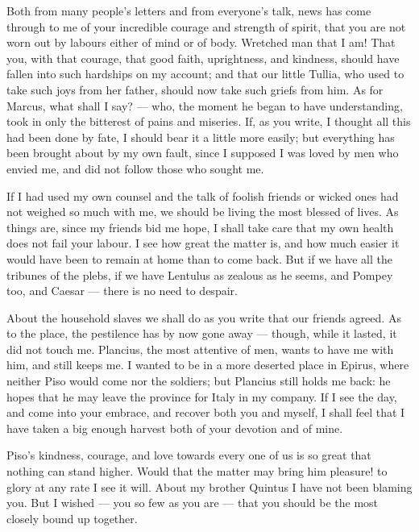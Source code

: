 

 Both from many people's letters and from everyone's talk, news has come through to me of your incredible courage and strength of spirit, that you are not worn out by labours either of mind or of body. Wretched man that I am! That you, with that courage, that good faith, uprightness, and kindness, should have fallen into such hardships on my account; and that our little Tullia, who used to take such joys from her father, should now take such griefs from him. As for Marcus, what shall I say? --- who, the moment he began to have understanding, took in only the bitterest of pains and miseries. If, as you write, I thought all this had been done by fate, I should bear it a little more easily; but everything has been brought about by my own fault, since I supposed I was loved by men who envied me, and did not follow those who sought me.

 If I had used my own counsel and the talk of foolish friends or wicked ones had not weighed so much with me, we should be living the most blessed of lives. As things are, since my friends bid me hope, I shall take care that my own health does not fail your labour. I see how great the matter is, and how much easier it would have been to remain at home than to come back. But if we have all the tribunes of the plebs, if we have Lentulus as zealous as he seems, and Pompey too, and Caesar --- there is no need to despair.

 About the household slaves we shall do as you write that our friends agreed. As to the place, the pestilence has by now gone away --- though, while it lasted, it did not touch me. Plancius, the most attentive of men, wants to have me with him, and still keeps me. I wanted to be in a more deserted place in Epirus, where neither Piso would come nor the soldiers; but Plancius still holds me back: he hopes that he may leave the province for Italy in my company. If I see the day, and come into your embrace, and recover both you and myself, I shall feel that I have taken a big enough harvest both of your devotion and of mine.

 Piso's kindness, courage, and love towards every one of us is so great that nothing can stand higher. Would that the matter may bring him pleasure! to glory at any rate I see it will. About my brother Quintus I have not been blaming you. But I wished --- you so few as you are --- that you should be the most closely bound up together.

